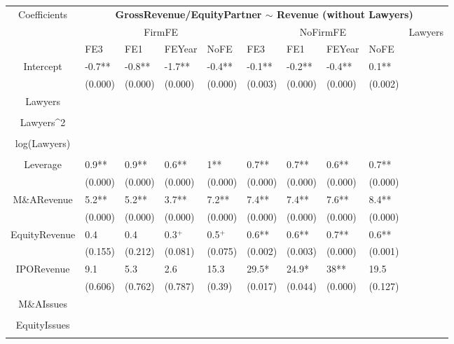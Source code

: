 \documentclass{article}
\begin{document}
\begin{table}[H]
\centering
\begin{tabular}{|clllllllll|}
\hline
\multirow{3}{*}{Coefficients} & \multicolumn{9}{c|}{\textbf{GrossRevenue/EquityPartner $\sim$ Revenue (without Lawyers)}} \\
\cline{2-10}
& \multicolumn{4}{c}{FirmFE} & \multicolumn{4}{c}{NoFirmFE} & \multirow{2}{*}{Lawyers} \\
\cline{2-9}
& FE3 & FE1 & FEYear & NoFE & FE3 & FE1 & FEYear & NoFE &  \\
\hline
 
Intercept & -0.7** & -0.8** & -1.7** & -0.4** & -0.1** & -0.2** & -0.4** & 0.1** & \\ 
   & (0.000) & (0.000) & (0.000) & (0.000) & (0.003) & (0.000) & (0.000) & (0.002) & \\ 
  Lawyers &  &  &  &  &  &  &  &  & \\ 
   &  &  &  &  &  &  &  &  & \\ 
  Lawyers^2 &  &  &  &  &  &  &  &  & \\ 
   &  &  &  &  &  &  &  &  & \\ 
  log(Lawyers) &  &  &  &  &  &  &  &  & \\ 
   &  &  &  &  &  &  &  &  & \\ 
  Leverage & 0.9** & 0.9** & 0.6** & 1** & 0.7** & 0.7** & 0.6** & 0.7** & \\ 
   & (0.000) & (0.000) & (0.000) & (0.000) & (0.000) & (0.000) & (0.000) & (0.000) & \\ 
  M\&ARevenue & 5.2** & 5.2** & 3.7** & 7.2** & 7.4** & 7.4** & 7.6** & 8.4** & \\ 
   & (0.000) & (0.000) & (0.000) & (0.000) & (0.000) & (0.000) & (0.000) & (0.000) & \\ 
  EquityRevenue & 0.4 & 0.4 & 0.3$^{+}$ & 0.5$^{+}$ & 0.6** & 0.6** & 0.7** & 0.6** & \\ 
   & (0.155) & (0.212) & (0.081) & (0.075) & (0.002) & (0.003) & (0.000) & (0.001) & \\ 
  IPORevenue & 9.1 & 5.3 & 2.6 & 15.3 & 29.5* & 24.9* & 38** & 19.5 & \\ 
   & (0.606) & (0.762) & (0.787) & (0.39) & (0.017) & (0.044) & (0.000) & (0.127) & \\ 
  M\&AIssues &  &  &  &  &  &  &  &  & \\ 
   &  &  &  &  &  &  &  &  & \\ 
  EquityIssues &  &  &  &  &  &  &  &  & \\ 
   &  &  &  &  &  &  &  &  & \\ 

\end{tabular}
\end{table}
\end{document}
